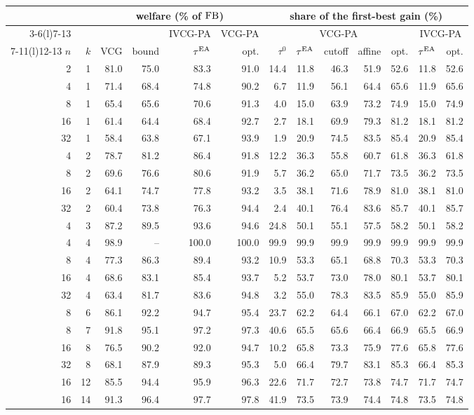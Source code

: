 \begin{tabular}{@{}rrrrrrrrrrrrr@{}}
\toprule
 & & \multicolumn{4}{c}{welfare (\% of $\mathrm{FB}$)} & \multicolumn{7}{c}{share of the first-best gain (\%)}\\
\cmidrule(lr){3-6}\cmidrule(l){7-13}
 & & & & IVCG-PA & VCG-PA & \multicolumn{5}{c}{VCG-PA} & \multicolumn{2}{c}{IVCG-PA}\\
\cmidrule(lr){7-11}\cmidrule(l){12-13}
$n$ & $k$ & VCG & bound & $\tau^{\mathrm{EA}}$ & opt. & $\tau^0$ & $\tau^{\mathrm{EA}}$ & cutoff & affine & opt. & $\tau^{\mathrm{EA}}$ & opt.\\
\midrule
2 & 1 & 81.0 & 75.0 & 83.3 & 91.0 & 14.4 & 11.8 & 46.3 & 51.9 & 52.6 & 11.8 & 52.6 \\
4 & 1 & 71.4 & 68.4 & 74.8 & 90.2 & 6.7 & 11.9 & 56.1 & 64.4 & 65.6 & 11.9 & 65.6 \\
8 & 1 & 65.4 & 65.6 & 70.6 & 91.3 & 4.0 & 15.0 & 63.9 & 73.2 & 74.9 & 15.0 & 74.9 \\
16 & 1 & 61.4 & 64.4 & 68.4 & 92.7 & 2.7 & 18.1 & 69.9 & 79.3 & 81.2 & 18.1 & 81.2 \\
32 & 1 & 58.4 & 63.8 & 67.1 & 93.9 & 1.9 & 20.9 & 74.5 & 83.5 & 85.4 & 20.9 & 85.4 \\
4 & 2 & 78.7 & 81.2 & 86.4 & 91.8 & 12.2 & 36.3 & 55.8 & 60.7 & 61.8 & 36.3 & 61.8 \\
8 & 2 & 69.6 & 76.6 & 80.6 & 91.9 & 5.7 & 36.2 & 65.0 & 71.7 & 73.5 & 36.2 & 73.5 \\
16 & 2 & 64.1 & 74.7 & 77.8 & 93.2 & 3.5 & 38.1 & 71.6 & 78.9 & 81.0 & 38.1 & 81.0 \\
32 & 2 & 60.4 & 73.8 & 76.3 & 94.4 & 2.4 & 40.1 & 76.4 & 83.6 & 85.7 & 40.1 & 85.7 \\
4 & 3 & 87.2 & 89.5 & 93.6 & 94.6 & 24.8 & 50.1 & 55.1 & 57.5 & 58.2 & 50.1 & 58.2 \\
4 & 4 & 98.9 & -- & 100.0 & 100.0 & 99.9 & 99.9 & 99.9 & 99.9 & 99.9 & 99.9 & 99.9 \\
8 & 4 & 77.3 & 86.3 & 89.4 & 93.2 & 10.9 & 53.3 & 65.1 & 68.8 & 70.3 & 53.3 & 70.3 \\
16 & 4 & 68.6 & 83.1 & 85.4 & 93.7 & 5.2 & 53.7 & 73.0 & 78.0 & 80.1 & 53.7 & 80.1 \\
32 & 4 & 63.4 & 81.7 & 83.6 & 94.8 & 3.2 & 55.0 & 78.3 & 83.5 & 85.9 & 55.0 & 85.9 \\
8 & 6 & 86.1 & 92.2 & 94.7 & 95.4 & 23.7 & 62.2 & 64.4 & 66.1 & 67.0 & 62.2 & 67.0 \\
8 & 7 & 91.8 & 95.1 & 97.2 & 97.3 & 40.6 & 65.5 & 65.6 & 66.4 & 66.9 & 65.5 & 66.9 \\
16 & 8 & 76.5 & 90.2 & 92.0 & 94.7 & 10.2 & 65.8 & 73.3 & 75.9 & 77.6 & 65.8 & 77.6 \\
32 & 8 & 68.1 & 87.9 & 89.3 & 95.3 & 5.0 & 66.4 & 79.7 & 83.1 & 85.3 & 66.4 & 85.3 \\
16 & 12 & 85.5 & 94.4 & 95.9 & 96.3 & 22.6 & 71.7 & 72.7 & 73.8 & 74.7 & 71.7 & 74.7 \\
16 & 14 & 91.3 & 96.4 & 97.7 & 97.8 & 41.9 & 73.5 & 73.9 & 74.4 & 74.8 & 73.5 & 74.8 \\
\bottomrule
\end{tabular}
